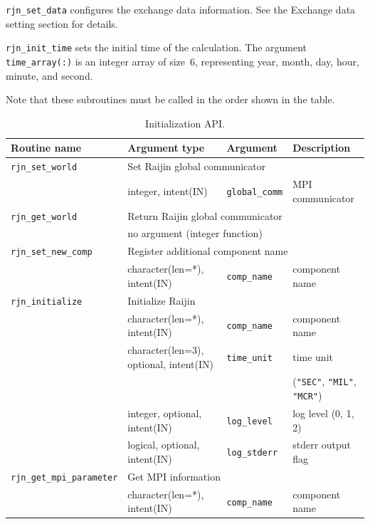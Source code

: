\documentclass[11pt,a4paper]{report}
\begin{document}
\texttt{rjn\_set\_data} configures
the exchange data information.
See the Exchange data setting section for details.

\texttt{rjn\_init\_time} sets the initial time
of the calculation.
The argument \texttt{time\_array(:)} is an integer array
of size~6, representing
year, month, day, hour, minute, and second.

Note that these subroutines must be called
in the order shown in the table.

\begin{table}[H]
\begin{center}
\caption{Initialization API.}
{\small
\label{table:rjn_api_initialize}
\begin{tabular}{llll}
\hline\hline
Routine name & Argument type & Argument & Description \\
\hline
\hline
\texttt{rjn\_set\_world} & \multicolumn{3}{l}{Set Raijin global communicator} \\
                & integer, intent(IN) & \texttt{global\_comm} & MPI communicator\\
\hline
 \texttt{rjn\_get\_world} & \multicolumn{3}{l}{Return Raijin global communicator} \\
                & \multicolumn{3}{l}{no argument (integer function)} \\
\hline
 \texttt{rjn\_set\_new\_comp} & \multicolumn{3}{l}{Register additional component name} \\
                & character(len=*), intent(IN) & \texttt{comp\_name} & component name\\
\hline
 \texttt{rjn\_initialize} &  \multicolumn{3}{l}{Initialize Raijin}\\
           &  character(len=*), intent(IN) &  \texttt{comp\_name} & component name\\
           &  character(len=3), optional, intent(IN)
             &  \texttt{time\_unit} & time unit \\
           &  & & (\texttt{"SEC"}, \texttt{"MIL"}, \texttt{"MCR"})\\
           &  integer, optional, intent(IN) &  \texttt{log\_level} & log level (0, 1, 2)\\
           &  logical, optional, intent(IN) &  \texttt{log\_stderr} & stderr output flag\\
\hline
 \texttt{rjn\_get\_mpi\_parameter} & \multicolumn{3}{l}{Get MPI information} \\
                & character(len=*), intent(IN) & \texttt{comp\_name} & component name\\

\end{tabular}}
\end{center}
\end{table}
\end{document}
